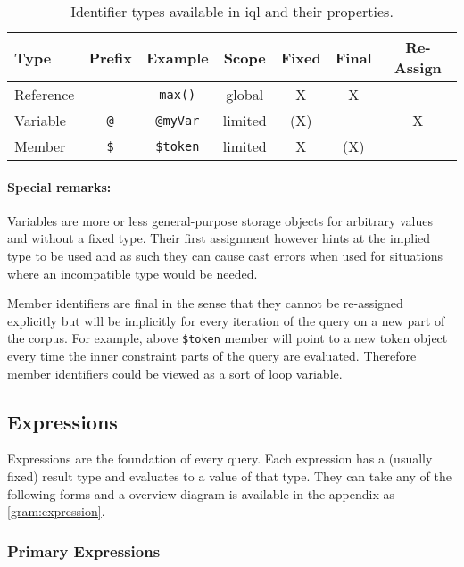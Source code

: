 \documentclass[11pt,a4paper]{article}
\begin{document}
\begin{table}[ht]
	\centering\begin{tabular}{|l|c|c|c|c|c|c|}
		\hline 
		Type	& Prefix & Example & Scope & Fixed\footnotemark & Final & Re-Assign \\ 
		\hline 
		Reference	&  & \texttt{max()} & global & X & X &  \\ 
		\hline 
		Variable	& \texttt{@} & \texttt{@myVar} & limited & (X) &  & X \\ 
		\hline 
		Member	& \texttt{\$} & \texttt{\$token} & limited & X & (X) &  \\ 
		\hline 
	\end{tabular}
	\caption[Identifier types]{Identifier types available in \ac{iql} and their properties.}
	\label{tab:identifiers}
\end{table}

\paragraph{Special remarks:}
\noindent Variables are more or less general-purpose storage objects for arbitrary values and without a fixed type. Their first assignment however hints at the implied type to be used and as such they can cause cast errors when used for situations where an incompatible type would be needed.

Member identifiers are final in the sense that they cannot be re-assigned explicitly but will be implicitly for every iteration of the query on a new part of the corpus. For example, above \texttt{\$token} member will point to a new token object every time the inner constraint parts of the query are evaluated. Therefore member identifiers could be viewed as a sort of loop variable. 

\subsection{Expressions}
\label{sec:expressions}

Expressions are the foundation of every query.
Each expression has a (usually fixed) result type and evaluates to a value of that type.
They can take any of the following forms and a overview diagram is available in the appendix as \cref{gram:expression}.

\subsubsection{Primary Expressions}
\label{sec:primary-expressions}
\end{document}

